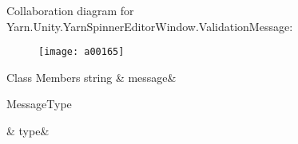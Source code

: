 Collaboration diagram for Yarn.\-Unity.\-Yarn\-Spinner\-Editor\-Window.\-Validation\-Message\-:
\nopagebreak
\begin{figure}[H]
\begin{center}
\leavevmode
\texttt{[image: a00165]}
\end{center}
\end{figure}
\begin{DoxyFields}{Class Members}
\hypertarget{a00085_a636dce6708e779c201fa5e7d01cf2955}{string}\label{a00085_a636dce6708e779c201fa5e7d01cf2955}
&
message&
\\
\hline

\hypertarget{a00085_a7d342190c7657fbbe85eb6fa66bcabb8}{Message\-Type}\label{a00085_a7d342190c7657fbbe85eb6fa66bcabb8}
&
type&
\\
\hline

\end{DoxyFields}
